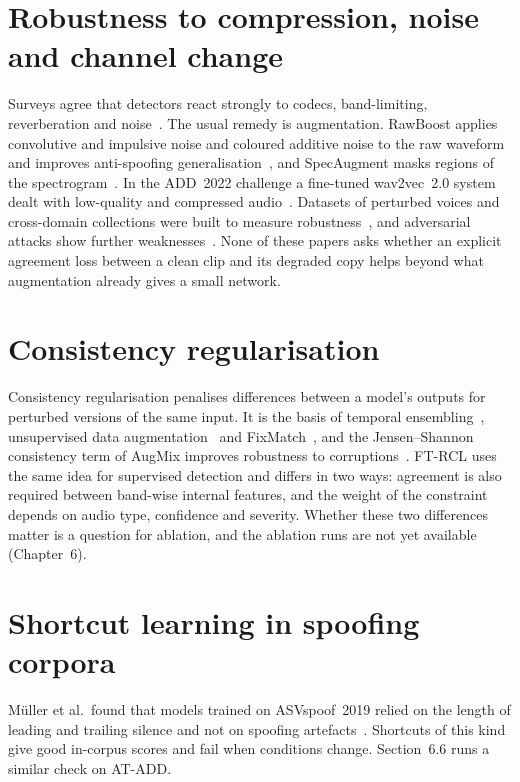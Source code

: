 \documentclass[12pt,a4paper]{report}
\begin{document}
\section{Robustness to compression, noise and channel change}

Surveys agree that detectors react strongly to codecs, band-limiting, reverberation and noise~\cite{zhang2025sensorsSurvey,alnaqbi2026systematic}. The usual remedy is augmentation. RawBoost applies convolutive and impulsive noise and coloured additive noise to the raw waveform and improves anti-spoofing generalisation~\cite{tak2022rawboost}, and SpecAugment masks regions of the spectrogram~\cite{park2019specaugment}. In the ADD~2022 challenge a fine-tuned wav2vec~2.0 system dealt with low-quality and compressed audio~\cite{martindonas2022vicomtech}. Datasets of perturbed voices and cross-domain collections were built to measure robustness~\cite{gao2024p2v,li2024crossdomain}, and adversarial attacks show further weaknesses~\cite{rabhi2024adversarial}. None of these papers asks whether an explicit agreement loss between a clean clip and its degraded copy helps beyond what augmentation already gives a small network.

\section{Consistency regularisation}

Consistency regularisation penalises differences between a model's outputs for perturbed versions of the same input. It is the basis of temporal ensembling~\cite{laine2017temporal}, unsupervised data augmentation~\cite{xie2020uda} and FixMatch~\cite{sohn2020fixmatch}, and the Jensen--Shannon consistency term of AugMix improves robustness to corruptions~\cite{hendrycks2020augmix}. FT-RCL uses the same idea for supervised detection and differs in two ways: agreement is also required between band-wise internal features, and the weight of the constraint depends on audio type, confidence and severity. Whether these two differences matter is a question for ablation, and the ablation runs are not yet available (Chapter~6).

\section{Shortcut learning in spoofing corpora}

M\"uller et al.\ found that models trained on ASVspoof~2019 relied on the length of leading and trailing silence and not on spoofing artefacts~\cite{muller2021silver}. Shortcuts of this kind give good in-corpus scores and fail when conditions change. Section~6.6 runs a similar check on AT-ADD.
\end{document}
